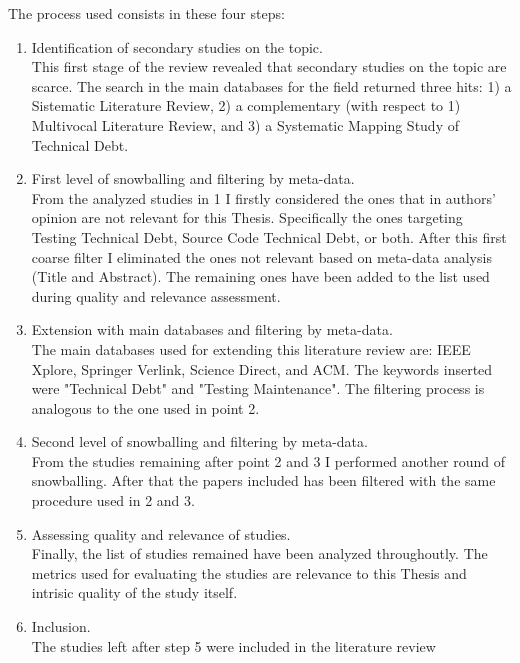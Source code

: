 The process used consists in these four steps:
\begin{enumerate}
    \item Identification of secondary studies on the topic.\\
        This first stage of the review revealed that secondary studies on the topic are scarce. The search in the main databases for the field returned three hits: 1) a Sistematic Literature Review, 2) a complementary (with respect to 1) Multivocal Literature Review, and 3) a Systematic Mapping Study of Technical Debt.
        
    \item First level of snowballing and filtering by meta-data.\\
        From the analyzed studies in 1 I firstly considered the ones that in authors' opinion are not relevant for this Thesis. Specifically the ones targeting Testing Technical Debt, Source Code Technical Debt, or both. After this first coarse filter I eliminated the ones not relevant based on meta-data analysis (Title and Abstract). The remaining ones have been added to the list used during quality and relevance assessment. 
        
    \item Extension with main databases and filtering by meta-data.\\
        The main databases used for extending this literature review are: IEEE Xplore, Springer Verlink, Science Direct, and ACM. The keywords inserted were "Technical Debt" and "Testing Maintenance". The filtering process is analogous to the one used in point 2.
    
    
    \item Second level of snowballing and filtering by meta-data.\\
        From the studies remaining after point 2 and 3 I performed another round of snowballing. After that the papers included has been filtered with the same procedure used in 2 and 3.
    
    
    \item Assessing quality and relevance of studies.\\
        Finally, the list of studies remained have been analyzed throughoutly. The metrics used for evaluating the studies are relevance to this Thesis and intrisic quality of the study itself. 
    
    
    \item Inclusion.\\
        The studies left after step 5 were included in the literature review
    
\end{enumerate}



